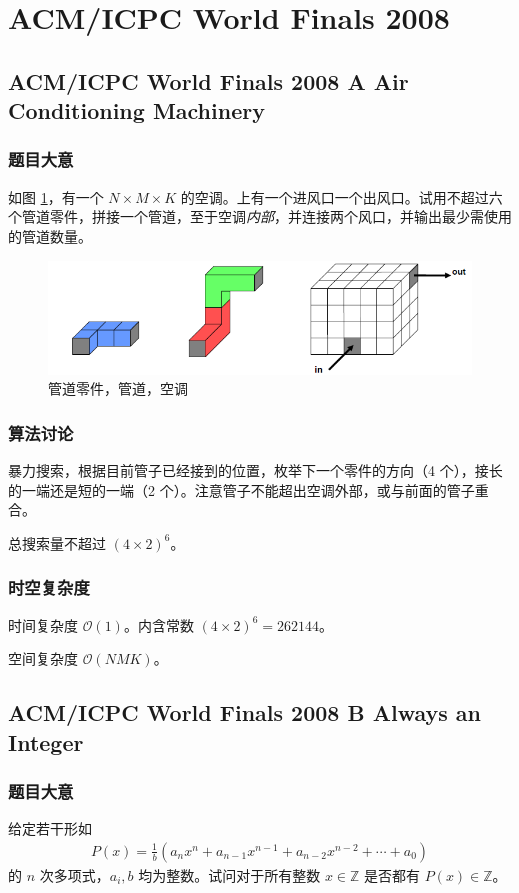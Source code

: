 
	\section{ACM/ICPC World Finals 2008}
		\subsection{ACM/ICPC World Finals 2008 A Air Conditioning Machinery}
			\subsubsection{题目大意}
				如图 \ref{2008aaa}，有一个 $N \times M \times K$  的空调。上有一个进风口一个出风口。试用不超过六个管道零件，拼接一个管道，至于空调\emph{内部}，并连接两个风口，并输出最少需使用的管道数量。
					
				\begin{figure}[htb]
					\centering
					\includegraphics[width=0.7 \textwidth]{2008a.png}
					\caption{管道零件，管道，空调} \label{2008aaa}
				\end{figure}
			
			\subsubsection{算法讨论}
				暴力搜索，根据目前管子已经接到的位置，枚举下一个零件的方向（4 个），接长的一端还是短的一端（2 个）。注意管子不能超出空调外部，或与前面的管子重合。
					
				总搜索量不超过 $(4 \times 2) ^ 6$。
			
			
			\subsubsection{时空复杂度}
				
				时间复杂度 $\mathcal{O}\left(1\right)$。内含常数  $(4 \times 2) ^ 6 = \num{262144} $。
					
				空间复杂度 $\mathcal{O}\left(NMK\right)$。
		\newpage
		\subsection{ACM/ICPC World Finals 2008 B Always an Integer}
			\subsubsection{题目大意}
				给定若干形如
				\begin{align}
					P(x) = \frac{1}{b} \left( a_nx^n + a_{n - 1} x^{n - 1} + a_{n - 2} x^{n - 2}  + \cdots + a_{0} %
					  \right)
				\end{align}
				的 $n$ 次多项式，$a_i, b$ 均为整数。试问对于所有整数 $x \in \mathbb{Z}$ 是否都有 $P(x) \in \mathbb{Z}$。
				

